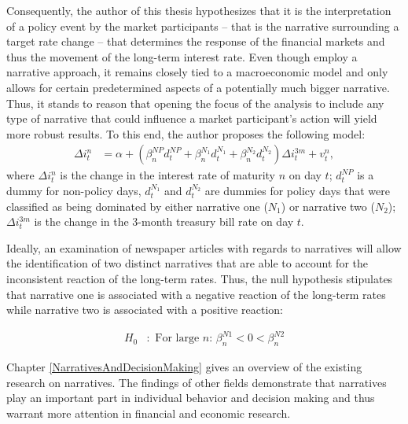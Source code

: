 \documentclass[11pt,a4paper,english,oneside]{book}
\numberwithin{equation}{chapter}
\begin{document}
Consequently, the author of this thesis hypothesizes that it is the interpretation of a policy event by the market participants -- that is the narrative surrounding a target rate change -- that determines the response of the financial markets and thus the movement of the long-term interest rate. Even though \cite{Ellingsen.2003} employ a narrative approach, it remains closely tied to a macroeconomic model and only allows for certain predetermined aspects of a potentially much bigger narrative. Thus, it stands to reason that opening the focus of the analysis to include any type of narrative that could influence a market participant's action will yield more robust results. To this end, the author proposes the following model:
\begin{align}\label{reg2}
\Delta i^n_t &= \alpha + (\beta_n^{NP}d_t^{NP} + \beta_n^{N_1}d_t^{N_1} + \beta_n^{N_2}d_t^{N_2})\Delta i^{3m}_t + v_t^n,
\end{align}
where $\Delta i^n_t$ is the change in the interest rate of maturity $n$ on day $t$; $d_t^{NP}$ is a dummy for non-policy days, $d_t^{N_1}$ and $d_t^{N_2}$ are dummies for policy days that were classified as being dominated by either narrative one ($N_1$) or narrative two ($N_2$); $\Delta i^{3m}_t$ is the change in the 3-month treasury bill rate on day $t$.

Ideally, an examination of newspaper articles with regards to narratives will allow the identification of two distinct narratives that are able to account for the inconsistent reaction of the long-term rates. Thus, the null hypothesis stipulates that narrative one is associated with a negative reaction of the long-term rates while narrative two is associated with a positive reaction:

\vspace{-24pt}
\begin{align}\label{H00}
H_0&:  \text{ For large $n$: } \beta_n^{N1}<0< \beta_n^{N2}
\end{align}

Chapter \ref{NarrativesAndDecisionMaking} 
gives an overview of the existing research on narratives. The findings of other fields demonstrate that narratives play an important part in individual behavior and decision making and thus warrant more attention in financial and economic research. 

\end{document}
